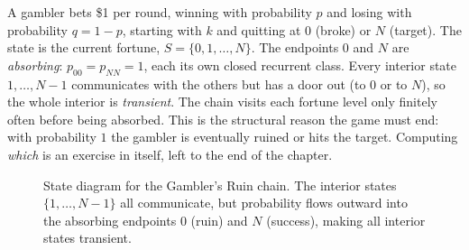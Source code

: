 \begin{example}
\label{ch23:ex-gamblers-ruin}
A gambler bets \$1 per round, winning with probability $p$ and losing with probability
$q = 1-p$, starting with $k$ and quitting at $0$ (broke) or $N$ (target). The state is the
current fortune, $S = \{0, 1, \dots, N\}$. The endpoints $0$ and $N$ are \emph{absorbing}:
$p_{00} = p_{NN} = 1$, each its own closed recurrent class. Every interior state
$1, \dots, N-1$ communicates with the others but has a door out (to $0$ or to $N$), so the
whole interior is \emph{transient}. The chain visits each fortune level only finitely often
before being absorbed. This is the structural reason the game must end: with probability $1$
the gambler is eventually ruined or hits the target. Computing \emph{which} is an
exercise in itself, left to the end of the chapter.
\end{example}

\begin{figure}[H]
\centering
{}
\caption{State diagram for the Gambler's Ruin chain. The interior states $\{1, \dots, N-1\}$ all communicate, but probability flows outward into the absorbing endpoints $0$ (ruin) and $N$ (success), making all interior states transient.}
\label{ch23:fig-gamblers-ruin}
\end{figure}


